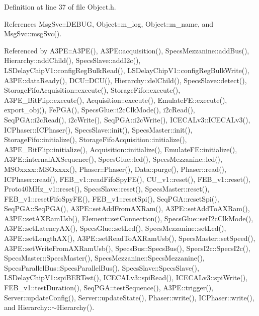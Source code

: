 Definition at line 37 of file Object.\+h.



References Msg\+Svc\+::\+D\+E\+B\+UG, Object\+::m\+\_\+log, Object\+::m\+\_\+name, and Msg\+Svc\+::msg\+Svc().



Referenced by A3\+P\+E\+::\+A3\+P\+E(), A3\+P\+E\+::acquisition(), Specs\+Mezzanine\+::add\+Bus(), Hierarchy\+::add\+Child(), Specs\+Slave\+::add\+I2c(), L\+S\+Delay\+Chip\+V1\+::config\+Reg\+Bulk\+Read(), L\+S\+Delay\+Chip\+V1\+::config\+Reg\+Bulk\+Write(), A3\+P\+E\+::data\+Ready(), D\+C\+U\+::\+D\+C\+U(), Hierarchy\+::del\+Child(), Specs\+Slave\+::detect(), Storage\+Fifo\+Acquisition\+::execute(), Storage\+Fifo\+::execute(), A3\+P\+E\+\_\+\+Bit\+Flip\+::execute(), Acquisition\+::execute(), Emulate\+F\+E\+::execute(), export\+\_\+obj(), Fe\+P\+G\+A(), Specs\+Glue\+::i2c\+Clk\+Mode(), i2c\+Read(), Seq\+P\+G\+A\+::i2c\+Read(), i2c\+Write(), Seq\+P\+G\+A\+::i2c\+Write(), I\+C\+E\+C\+A\+Lv3\+::\+I\+C\+E\+C\+A\+Lv3(), I\+C\+Phaser\+::\+I\+C\+Phaser(), Specs\+Slave\+::init(), Specs\+Master\+::init(), Storage\+Fifo\+::initialize(), Storage\+Fifo\+Acquisition\+::initialize(), A3\+P\+E\+\_\+\+Bit\+Flip\+::initialize(), Acquisition\+::initialize(), Emulate\+F\+E\+::initialize(), A3\+P\+E\+::internal\+A\+X\+Sequence(), Specs\+Glue\+::led(), Specs\+Mezzanine\+::led(), M\+S\+Oxxxx\+::\+M\+S\+Oxxxx(), Phaser\+::\+Phaser(), Data\+::purge(), Phaser\+::read(), I\+C\+Phaser\+::read(), F\+E\+B\+\_\+v1\+::read\+Fifo\+Spy\+F\+E(), C\+U\+\_\+v1\+::reset(), F\+E\+B\+\_\+v1\+::reset(), Proto40\+M\+Hz\+\_\+v1\+::reset(), Specs\+Slave\+::reset(), Specs\+Master\+::reset(), F\+E\+B\+\_\+v1\+::reset\+Fifo\+Spy\+F\+E(), F\+E\+B\+\_\+v1\+::reset\+Spi(), Seq\+P\+G\+A\+::reset\+Spi(), Seq\+P\+G\+A\+::\+Seq\+P\+G\+A(), A3\+P\+E\+::set\+Add\+From\+A\+X\+Ram(), A3\+P\+E\+::set\+Add\+To\+A\+X\+Ram(), A3\+P\+E\+::set\+A\+X\+Ram\+Usb(), Element\+::set\+Connection(), Specs\+Glue\+::set\+I2c\+Clk\+Mode(), A3\+P\+E\+::set\+Latency\+A\+X(), Specs\+Glue\+::set\+Led(), Specs\+Mezzanine\+::set\+Led(), A3\+P\+E\+::set\+Length\+A\+X(), A3\+P\+E\+::set\+Read\+To\+A\+X\+Ram\+Usb(), Specs\+Master\+::set\+Speed(), A3\+P\+E\+::set\+Write\+From\+A\+X\+Ram\+Usb(), Specs\+Bus\+::\+Specs\+Bus(), Specs\+I2c\+::\+Specs\+I2c(), Specs\+Master\+::\+Specs\+Master(), Specs\+Mezzanine\+::\+Specs\+Mezzanine(), Specs\+Parallel\+Bus\+::\+Specs\+Parallel\+Bus(), Specs\+Slave\+::\+Specs\+Slave(), L\+S\+Delay\+Chip\+V1\+::spi\+B\+E\+R\+Test(), I\+C\+E\+C\+A\+Lv3\+::spi\+Read(), I\+C\+E\+C\+A\+Lv3\+::spi\+Write(), F\+E\+B\+\_\+v1\+::test\+Duration(), Seq\+P\+G\+A\+::test\+Sequence(), A3\+P\+E\+::trigger(), Server\+::update\+Config(), Server\+::update\+State(), Phaser\+::write(), I\+C\+Phaser\+::write(), and Hierarchy\+::$\sim$\+Hierarchy().



